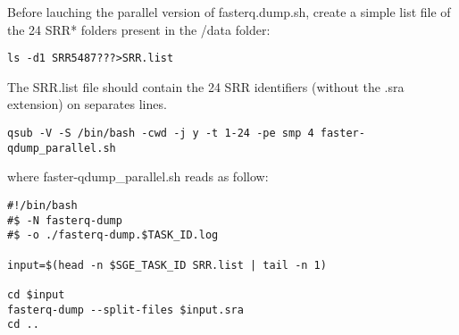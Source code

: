 Before lauching the parallel version of fasterq.dump.sh, create a simple list file of the 24 SRR* folders present in the /data folder:

\begin{verbatim}
ls -d1 SRR5487???>SRR.list
\end{verbatim}

The SRR.list file should contain the 24 SRR identifiers (without the .sra extension) on separates lines.

\begin{verbatim}
qsub -V -S /bin/bash -cwd -j y -t 1-24 -pe smp 4 faster-qdump_parallel.sh
\end{verbatim}

where \noindent faster-qdump\_parallel.sh reads as follow:
\begin{verbatim}
#!/bin/bash
#$ -N fasterq-dump
#$ -o ./fasterq-dump.$TASK_ID.log
	
input=$(head -n $SGE_TASK_ID SRR.list | tail -n 1)
	
cd $input
fasterq-dump --split-files $input.sra
cd ..
\end{verbatim}












